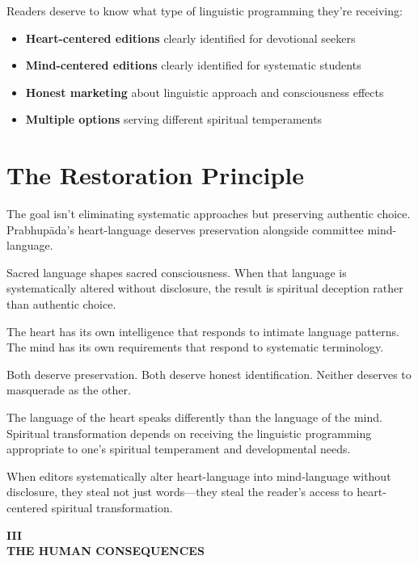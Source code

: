 \documentclass[11pt,twoside]{book}
\makeatletter
\def\cleardoublepage{\clearpage\if@twoside \ifodd\c@page\else\hbox{}\thispagestyle{empty}\newpage\if@twocolumn\hbox{}\newpage\fi\fi\fi}
\makeatother
\begin{document}
Readers deserve to know what type of linguistic programming they're receiving:

\begin{itemize}
\item \textbf{\textbf{Heart-centered editions}} clearly identified for devotional seekers
\item \textbf{\textbf{Mind-centered editions}} clearly identified for systematic students
\item \textbf{\textbf{Honest marketing}} about linguistic approach and consciousness effects
\item \textbf{\textbf{Multiple options}} serving different spiritual temperaments
\end{itemize}
\section*{The Restoration Principle}
\label{sec:org1eb5cfe}

The goal isn't eliminating systematic approaches but preserving authentic choice. Prabhupāda's heart-language deserves preservation alongside committee mind-language.

Sacred language shapes sacred consciousness. When that language is systematically altered without disclosure, the result is spiritual deception rather than authentic choice.

The heart has its own intelligence that responds to intimate language patterns. The mind has its own requirements that respond to systematic terminology.

Both deserve preservation. Both deserve honest identification. Neither deserves to masquerade as the other.

The language of the heart speaks differently than the language of the mind. Spiritual transformation depends on receiving the linguistic programming appropriate to one's spiritual temperament and developmental needs.

When editors systematically alter heart-language into mind-language without disclosure, they steal not just words—they steal the reader's access to heart-centered spiritual transformation.

\cleardoublepage
\thispagestyle{empty}
\vspace*{0.25\textheight}
\begin{center}
{\Huge\bfseries\MakeUppercase{\textbf{III}}}\\[0.5cm]
{\huge\bfseries THE HUMAN CONSEQUENCES}
\end{center}
\vspace*{\fill}
\clearpage
\thispagestyle{empty} %
\mbox{}
\newpage
\end{document}
